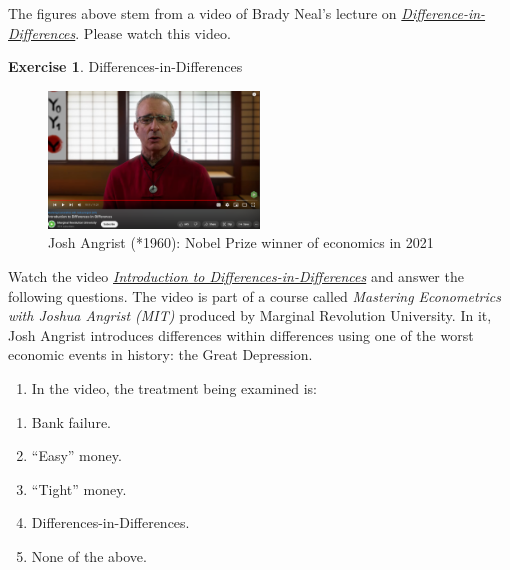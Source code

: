 \documentclass[
  12pt,
  oneside]{book}
\providecommand{\tightlist}{%
  \setlength{\itemsep}{0pt}\setlength{\parskip}{0pt}}
\theoremstyle{definition}
\theoremstyle{definition}
\theoremstyle{definition}
\newtheorem{exercise}{Exercise}[chapter]
\theoremstyle{definition}
\theoremstyle{remark}
\begin{document}
The figures above stem from a video of Brady Neal's lecture on \href{https://youtu.be/2nDgrNP7XSE}{\emph{Difference-in-Differences}}. Please watch this video.

\begin{exercise}
\protect\hypertarget{exr:DiD}{}\label{exr:DiD}Differences-in-Differences

\begin{figure}
\centering
\includegraphics[width=0.5\textwidth,height=\textheight]{fig/angrist-did.png}
\caption[\label{fig:angristdid} Josh Angrist (*1960): Nobel Prize winner of economics in 2021]{\label{fig:angristdid} Josh Angrist (*1960): Nobel Prize winner of economics in 2021\footnotemark{}}
\end{figure}

Watch the video \href{https://youtu.be/eiffOVbYvNc}{\emph{Introduction to Differences-in-Differences}} and answer the following questions. The video is part of a course called \emph{Mastering Econometrics with Joshua Angrist (MIT)} produced by Marginal Revolution University. In it, Josh Angrist introduces differences within differences using one of the worst economic events in history: the Great Depression.

\begin{enumerate}
\def\labelenumi{\arabic{enumi}.}
\tightlist
\item
  In the video, the treatment being examined is:
\end{enumerate}

\begin{enumerate}
\def\labelenumi{\alph{enumi})}
\tightlist
\item
  Bank failure.
\item
  ``Easy'' money.
\item
  ``Tight'' money.
\item
  Differences-in-Differences.
\item
  None of the above.
\end{enumerate}


\end{exercise}
\end{document}
